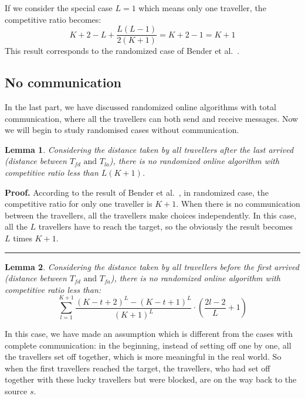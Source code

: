 \documentclass[a4paper, 10pt]{article}
\newtheorem{lemma}{Lemma}
\newenvironment{proof}[1][Proof]{\textbf{#1.} }{\ \rule{0.5em}{0.5em}}
\begin{document}
If we consider the special case $L=1$ which means only one traveller, the competitive ratio becomes:
\[
K+2-L+ \frac{L(L-1)}{2(K+1)} = K+2-1 = K+1
\]
This result corresponds to the randomized case of Bender et al.~\cite{BeWe15}.

\subsection{No communication}

In the last part, we have discussed randomized online algorithms with total communication, where all the travellers can both send and receive messages. Now we will begin to study randomised cases without communication. 

\begin{lemma}
Considering the distance taken by all travellers after the last arrived (distance between $T_{fd} \mbox{\ and } T_{la}$), there is no randomized online algorithm with competitive ratio less than $ L(K+1)$.
\end{lemma}

\begin{proof} 
According to the result of Bender et al.~\cite{BeWe15}, in randomized case, the competitive ratio for only one traveller is $K+1$. When there is no communication between the travellers, all the travellers make choices independently. In this case, all the $L$ travellers have to reach the target, so the obviously the result becomes $L$ times $K+1$.
\end{proof}

\begin{lemma}
Considering the distance taken by all travellers before the first arrived (distance between $T_{fd} \mbox{\ and } T_{fa}$), there is no randomized online algorithm with competitive ratio less than:
\begin{equation}
\sum_{l=1}^{K+1}\frac{(K-t+2)^{L} - (K-t+1)^{L}}{(K+1)^{L}}\cdot (\frac{2l-2}{L}+1)
\label{cr_rand}
\end{equation}
\end{lemma}

In this case, we have made an assumption which is different from the cases with complete communication: in the beginning, instead of setting off one by one, all the travellers set off together, which is more meaningful in the real world. So when the first travellers reached the target, the travellers, who had set off together with these lucky travellers but were blocked, are on the way back to the source $s$.
\end{document}
